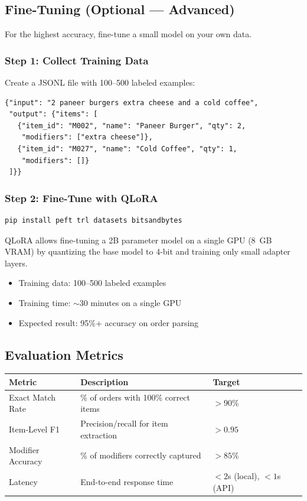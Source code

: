 \documentclass[12pt, a4paper]{article}
\begin{document}
\subsection{Fine-Tuning (Optional --- Advanced)}

For the highest accuracy, fine-tune a small model on your own data.

\subsubsection{Step 1: Collect Training Data}
Create a JSONL file with 100--500 labeled examples:
\begin{lstlisting}
{"input": "2 paneer burgers extra cheese and a cold coffee",
 "output": {"items": [
   {"item_id": "M002", "name": "Paneer Burger", "qty": 2,
    "modifiers": ["extra cheese"]},
   {"item_id": "M027", "name": "Cold Coffee", "qty": 1,
    "modifiers": []}
 ]}}
\end{lstlisting}

\subsubsection{Step 2: Fine-Tune with QLoRA}
\begin{lstlisting}[language=bash]
pip install peft trl datasets bitsandbytes
\end{lstlisting}

QLoRA allows fine-tuning a 2B parameter model on a single GPU (8~GB VRAM) by quantizing the base model to 4-bit and training only small adapter layers.

\begin{itemize}[nosep]
    \item Training data: 100--500 labeled examples
    \item Training time: $\sim$30 minutes on a single GPU
    \item Expected result: 95\%+ accuracy on order parsing
\end{itemize}


\subsection{Evaluation Metrics}
\begin{center}
\begin{tabular}{lll}
\toprule
\textbf{Metric} & \textbf{Description} & \textbf{Target} \\
\midrule
Exact Match Rate  & \% of orders with 100\% correct items & $> 90\%$ \\
Item-Level F1     & Precision/recall for item extraction   & $> 0.95$ \\
Modifier Accuracy & \% of modifiers correctly captured     & $> 85\%$ \\
Latency           & End-to-end response time               & $< 2$s (local), $< 1$s (API) \\
\bottomrule
\end{tabular}
\end{center}
\end{document}
